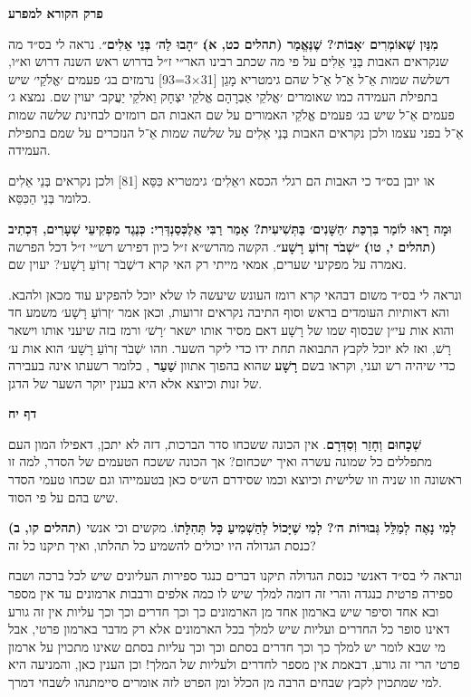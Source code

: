 \documentclass[12pt, openany]{book}
\newcommand{\sethebfont}{
\fontsize{10.5pt}{13.1pt} \selectfont
}
\newcommand{\textblock}[1]{
{\sethebfont #1\\}	
}
\newcommand{\chapname}{}
\newcommand{\sectname}{}
\newcommand{\newchap}[1]{
	\addcontentsline{toc}{chapter}{#1}
	\renewcommand{\chapname}{#1}
		\begin{center}
			\textbf{%
\fontsize{16pt}{16pt}\selectfont
				#1}
		\end{center}
}
\newcommand{\newsection}[1]{
	\renewcommand{\sectname}{#1}	
	\vspace{-\baselineskip}
	\begin{center}
		\textbf{%
\fontsize{16pt}{16pt}\selectfont
			#1}
	\end{center}
	\vspace{-\baselineskip}
	\nopagebreak
}
\begin{document}
\newchap{פרק  הקורא למפרע}
\textblock{\textbf{מִנַּיִן שֶׁאוֹמְרִים ׳אָבוֹת׳? שֶׁנֶּאֱמַר {\small (תהלים כט, א)}׃ ״הָבוּ לַה׳ בְּנֵי אֵלִים״}. נראה לי בס״ד מה שנקראים האבות בְּנֵי אֵלִים על פי מה שכתב רבינו האר״י ז״ל בדרוש ראש השנה דרוש וא״ו, דשלשה שמות אֵ־ל אֵ־ל אֵ־ל שהם גימטריא מָגֵן {\small [31×3=93]} נרמזים בג׳ פעמים ׳אֱלֹקֵי׳ שיש בתפילת העמידה כמו שאומרים ׳אֱלקֵי אַבְרָהָם אֱלקֵי יִצְחָק וֵאלקֵי יַעֲקב׳ יעוין שם. נמצא ג׳ פעמים אֵ־ל שיש בג׳ פעמים אֱלֹקֵי האמורים על שם האבות הם רומזים לבחינת שלשה שמות אֵ־ל בפני עצמו ולכן נקראים האבות בְּנֵי אֵלִים על שלשה שמות אֵ־ל הנזכרים על שמם בתפילת העמידה.\par או יובן בס״ד כי האבות הם רגלי הכסא ו׳אֵלִים׳ גימטריא כִּסֵּא {\small [81]} ולכן נקראים בְּנֵי אֵלִים כלומר בְּנֵי הַכִּסֵּא.}
\textblock{\textbf{וּמָה רָאוּ לוֹמַר בִּרְכַּת ׳הַשָּׁנִים׳ בַּתְּשִׁיעִית? אָמַר רַבִּי אַלֶכְּסַנְדְּרִי: כְּנֶגֶד מַפְקִיעֵי שְׁעָרִים, דִּכְתִיב {\small (תהלים י, טו)}׃ ״שְׁבֹר זְרוֹעַ רָשָׁע״}. הקשה מהרש״א ז״ל כיון דפירש רש״י ז״ל דכל הפרשה נאמרה על מפקיעי שערים, אמאי מייתי רק האי קרא ד׳שְׁבֹר זְרוֹעַ רָשָׁע׳? יעוין שם.\par ונראה לי בס״ד משום דבהאי קרא רומז העונש שיעשה לו שלא יוכל להפקיע עוד מכאן ולהבא. והא דאותיות העומדים בראש וסוף התיבה נקראים זרועות, וכאן אמר ׳זְרוֹעַ רָשָׁע׳ משמע חד והוא אות עי״ן שבסוף שמו של רָשָׁע דאם מסיר אותו ישאר ׳רָשׁ׳ ורמז בזה שיעני אותו וישאר רָשׁ, ואז לא יוכל לקבץ התבואה תחת ידו כדי ליקר השער. וזהו ׳שְׁבֹר זְרוֹעַ רָשָׁע׳ הוא אות ע׳ כדי שיהיה רש ועני, וקראו בשם \textbf{רָשָׁע} שהוא בהפוך אתוון \textbf{שַׁעַר} , כלומר רשעתו אינה בעבירה של זנות וכיוצא אלא היא בענין יוקר השער של הדגן.}
\clearpage
\newsection{דף יח}
\textblock{\textbf{שְׁכָחוּם וְחָזַר וְסִדְּרָם}. אין הכונה ששכחו סדר הברכות, דזה לא יתכן, דאפילו המון העם מתפללים כל שמונה עשרה ואיך ישכחום? אך הכונה ששכח הטעמים של הסדר, למה זו ראשונה וזו שניה וזו שלישית וכיוצא וכמו שסידרם הש״ס כאן בטעמייהו וגם שכחו טעמי הסדר שיש בהם על פי הסוד.}
\textblock{\textbf{{\small (תהלים קו, ב)} לְמִי נָאֶה לְמַלֵּל גְּבוּרוֹת ה׳? לְמִי שֶׁיָּכוֹל לְהַשְׁמִיעַ כָּל תְּהִלָּתוֹ}. מקשים וכי אנשי כנסת הגדולה היו יכולים להשמיע כל תהלתו, ואיך תיקנו כל זה?\par ונראה לי בס״ד דאנשי כנסת הגדולה תיקנו דברים כנגד ספירות העליונים שיש לכל ברכה ושבח ספירה פרטית כנגדה והרי זה דומה למלך שיש לו כמה אלפים ורבבות ארמונים עד אין מספר ובא אחד וסיפר שיש בארמון אחד מן הארמונים כך וכך חדרים וכך וכך עליות אין זה גורע דאינו סופר כל החדרים ועליות שיש למלך בכל הארמונים אלא רק מדבר בארמון פרטי, אבל מי שבא לומר יש למלך כך וכך חדרים בסתם וכך וכך עליות בסתם שאינו מתכוין על ארמון פרטי הרי זה גורע, דבאמת אין מספר לחדרים ולעליות של המלך! וכן הענין כאן, והמניעה היא למי שמתכוין לקבץ שבחים הרבה מן הכלל ומן הפרט לזה אומרים סיימתנהו לשבחי דמרך.}
\end{document}
